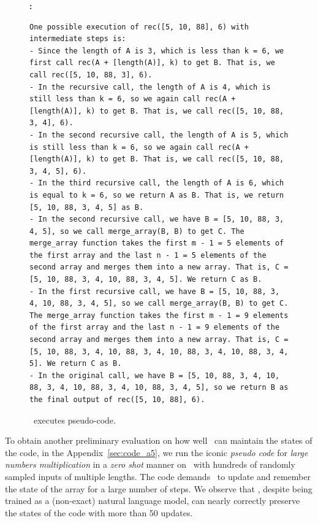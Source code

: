 \begin{figure}[H]
\begin{AIbox}{\DV}
{\bf \DV:}
\begin{verbatim}
One possible execution of rec([5, 10, 88], 6) with intermediate steps is:
- Since the length of A is 3, which is less than k = 6, we first call rec(A + [length(A)], k) to get B. That is, we call rec([5, 10, 88, 3], 6).
- In the recursive call, the length of A is 4, which is still less than k = 6, so we again call rec(A + [length(A)], k) to get B. That is, we call rec([5, 10, 88, 3, 4], 6).
- In the second recursive call, the length of A is 5, which is still less than k = 6, so we again call rec(A + [length(A)], k) to get B. That is, we call rec([5, 10, 88, 3, 4, 5], 6).
- In the third recursive call, the length of A is 6, which is equal to k = 6, so we return A as B. That is, we return [5, 10, 88, 3, 4, 5] as B.
- In the second recursive call, we have B = [5, 10, 88, 3, 4, 5], so we call merge_array(B, B) to get C. The merge_array function takes the first m - 1 = 5 elements of the first array and the last n - 1 = 5 elements of the second array and merges them into a new array. That is, C = [5, 10, 88, 3, 4, 10, 88, 3, 4, 5]. We return C as B.
- In the first recursive call, we have B = [5, 10, 88, 3, 4, 10, 88, 3, 4, 5], so we call merge_array(B, B) to get C. The merge_array function takes the first m - 1 = 9 elements of the first array and the last n - 1 = 9 elements of the second array and merges them into a new array. That is, C = [5, 10, 88, 3, 4, 10, 88, 3, 4, 10, 88, 3, 4, 10, 88, 3, 4, 5]. We return C as B.
- In the original call, we have B = [5, 10, 88, 3, 4, 10, 88, 3, 4, 10, 88, 3, 4, 10, 88, 3, 4, 5], so we return B as the final output of rec([5, 10, 88], 6).
\end{verbatim}
\end{AIbox}
\caption{\DV\ executes pseudo-code.}
\label{fig:pseudocode1}
\end{figure}

To obtain another preliminary evaluation on how well \DV\ can maintain the states of the code, in the Appendix~\ref{sec:code_a5}, we run the iconic \textit{pseudo code} for \textit{large numbers multiplication} in a \textit{zero shot} manner on \DV\ with hundreds of randomly sampled inputs of multiple lengths. The code demands \DV\ to update and remember the state of the array for a large number of steps. We observe that \DV, despite being trained as a (non-exact) natural language model, can nearly correctly preserve the states of the code with more than 50 updates.











